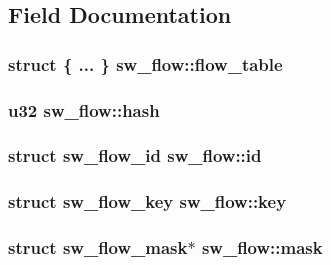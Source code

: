 \subsection{Field Documentation}
\hypertarget{structsw__flow_abca0040cced6a4a84d1a8941764fb5d6}{}
\subsubsection[{flow\+\_\+table}]{\setlength{\rightskip}{0pt plus 5cm}struct \{ ... \}   sw\+\_\+flow\+::flow\+\_\+table}\label{structsw__flow_abca0040cced6a4a84d1a8941764fb5d6}
\hypertarget{structsw__flow_a7a33a6a5c62113ffe949a700ef648a71}{}
\subsubsection[{hash}]{\setlength{\rightskip}{0pt plus 5cm}u32 sw\+\_\+flow\+::hash}\label{structsw__flow_a7a33a6a5c62113ffe949a700ef648a71}
\hypertarget{structsw__flow_a6e6645eec909d54871675be30000c0b9}{}
\subsubsection[{id}]{\setlength{\rightskip}{0pt plus 5cm}struct {\bf sw\+\_\+flow\+\_\+id} sw\+\_\+flow\+::id}\label{structsw__flow_a6e6645eec909d54871675be30000c0b9}
\hypertarget{structsw__flow_a14b83cbd65275bda4e97ae35500d26d8}{}
\subsubsection[{key}]{\setlength{\rightskip}{0pt plus 5cm}struct {\bf sw\+\_\+flow\+\_\+key} sw\+\_\+flow\+::key}\label{structsw__flow_a14b83cbd65275bda4e97ae35500d26d8}
\hypertarget{structsw__flow_a89c162e340693d0bb4977737e2b68c22}{}
\subsubsection[{mask}]{\setlength{\rightskip}{0pt plus 5cm}struct {\bf sw\+\_\+flow\+\_\+mask}$\ast$ sw\+\_\+flow\+::mask}\label{structsw__flow_a89c162e340693d0bb4977737e2b68c22}
\hypertarget{structsw__flow_ad56483ca56d2f95857eee360e934fcf2}{}
